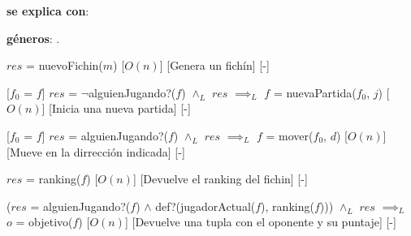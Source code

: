 \documentclass{book}
\begin{document}
    \begin{Interfaz}

        \textbf{se explica con}: 

        \textbf{géneros}: .


        {$res$ = nuevoFichin($m$)}%
        [$O(n)$]
        [Genera un fichín]
        [-]

        [$f_0$ = $f$]
        {$res$ = $\neg$alguienJugando?($f$) $\wedge_L$ $res$ $\implies_L$ $f$ = nuevaPartida($f_0$, $j$) }%
        [$O(n)$]
        [Inicia una nueva partida]
        [-]

        [$f_0$ = $f$]
        {$res$ = alguienJugando?($f$) $\wedge_L$ $res$ $\implies_L$ $f$ = mover($f_0$, $d$) }%
        [$O(n)$]
        [Mueve en la dirrección indicada]
        [-]

        {$res$ = ranking($f$)}%
        [$O(n)$]
        [Devuelve el ranking del fichin]
        [-]

        {($res$ = alguienJugando?($f$) $\wedge$ def?(jugadorActual($f$), ranking($f$))) $\wedge_L$ $res$ $\implies_L$ $o$ = objetivo($f$) }%
        [$O(n)$]
        [Devuelve una tupla con el oponente y su puntaje]
        [-]

    \end{Interfaz}
\end{document}
